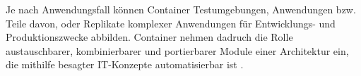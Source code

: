 \documentclass[../main.tex]{subfiles}
\begin{document}
		Je nach Anwendungsfall können Container Testumgebungen, Anwendungen bzw. Teile davon, oder Replikate komplexer Anwendungen für Entwicklungs- und Produktionszwecke abbilden. Container nehmen dadruch die Rolle austauschbarer, kombinierbarer und portierbarer Module einer Architektur ein, die mithilfe besagter IT-Konzepte automatisierbar ist \cite[S.12]{dockerBook}.







\end{document}
